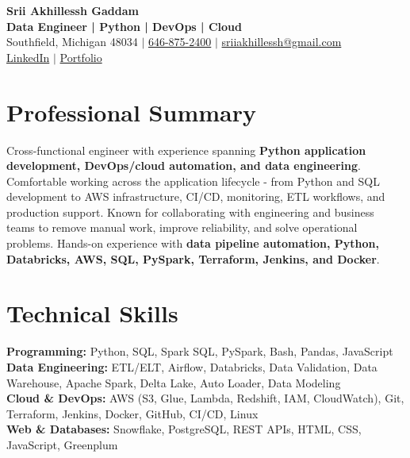 \documentclass[letterpaper,10pt]{article}
\begin{document}
\fontsize{9.35pt}{10.45pt}\selectfont

\begin{center}
    {\LARGE \textbf{Srii Akhillessh Gaddam}} \\[-1pt]
    \textbf{Data Engineer | Python | DevOps | Cloud} \\[2pt]
    Southfield, Michigan 48034 $|$
    \href{tel:6468752400}{646-875-2400} $|$
    \href{mailto:sriiakhillessh@gmail.com}{sriiakhillessh@gmail.com} \\[1pt]
    \href{https://www.linkedin.com/in/srii-akhiilessh-gaddam-b48668191/}{LinkedIn} $|$
    \href{https://sriiakhillesshg.github.io/portfolio/}{Portfolio}
\end{center}
\vspace{-8pt}

\section{Professional Summary}
\small{Cross-functional engineer with experience spanning \textbf{Python application development, DevOps/cloud automation, and data engineering}. Comfortable working across the application lifecycle - from Python and SQL development to AWS infrastructure, CI/CD, monitoring, ETL workflows, and production support. Known for collaborating with engineering and business teams to remove manual work, improve reliability, and solve operational problems. Hands-on experience with \textbf{data pipeline automation, Python, Databricks, AWS, SQL, PySpark, Terraform, Jenkins, and Docker}.}

\section{Technical Skills}
\small{
\textbf{Programming:} Python, SQL, Spark SQL, PySpark, Bash, Pandas, JavaScript \\
\textbf{Data Engineering:} ETL/ELT, Airflow, Databricks, Data Validation, Data Warehouse, Apache Spark, Delta Lake, Auto Loader, Data Modeling \\
\textbf{Cloud \& DevOps:} AWS (S3, Glue, Lambda, Redshift, IAM, CloudWatch), Git, Terraform, Jenkins, Docker, GitHub, CI/CD, Linux \\
\textbf{Web \& Databases:} Snowflake, PostgreSQL, REST APIs, HTML, CSS, JavaScript, Greenplum
}
\end{document}

